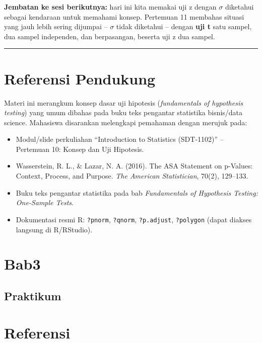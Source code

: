 \documentclass[
  indonesian,
  letterpaper,
]{book}
\providecommand{\tightlist}{%
  \setlength{\itemsep}{0pt}\setlength{\parskip}{0pt}}
\begin{document}
\textbf{Jembatan ke sesi berikutnya:} hari ini kita memakai uji z dengan
\(\sigma\) diketahui sebagai kendaraan untuk memahami konsep. Pertemuan
11 membahas situasi yang jauh lebih sering dijumpai -- \(\sigma\) tidak
diketahui -- dengan \textbf{uji t} satu sampel, dua sampel independen,
dan berpasangan, beserta uji z dua sampel.

\begin{center}\rule{0.5\linewidth}{0.5pt}\end{center}


\chapter{Referensi Pendukung}\label{referensi-pendukung-1}

Materi ini merangkum konsep dasar uji hipotesis (\emph{fundamentals of
hypothesis testing}) yang umum dibahas pada buku teks pengantar
statistika bisnis/data science. Mahasiswa disarankan melengkapi
pemahaman dengan merujuk pada:

\begin{itemize}
\tightlist
\item
  Modul/slide perkuliahan ``Introduction to Statistics (SDT-1102)'' --
  Pertemuan 10: Konsep dan Uji Hipotesis.
\item
  Wasserstein, R. L., \& Lazar, N. A. (2016). The ASA Statement on
  p-Values: Context, Process, and Purpose. \emph{The American
  Statistician}, 70(2), 129--133.
\item
  Buku teks pengantar statistika pada bab \emph{Fundamentals of
  Hypothesis Testing: One-Sample Tests}.
\item
  Dokumentasi resmi R: \texttt{?pnorm}, \texttt{?qnorm},
  \texttt{?p.adjust}, \texttt{?polygon} (dapat diakses langsung di
  R/RStudio).
\end{itemize}


\chapter{Bab3}\label{bab3}

\section{Praktikum}\label{praktikum}


\chapter*{Referensi}\label{referensi}


\protect{}\label{refs}


\backmatter
\end{document}
